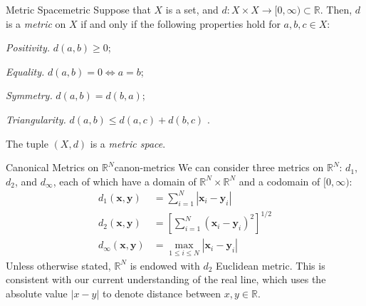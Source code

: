 \documentclass{article}
\renewcommand*\vec{\mathbf}
\numberwithin{equation}{section}
\numberwithin{figure}{section}
\newcommand*\setaxiomprefix[1]{
    \setlist[axioms]{label=#1\arabic*), ref=#1\arabic*}
}
\begin{document}
\begin{definition}{Metric Space}{metric}
    Suppose that $ X $ is a set, and $ d \colon X \times X \to [0, \infty)
    \subset \mathbb{R} $. Then, $ d $ is a \emph{metric} on $ X $ if and only if
    the following properties hold for $ a, b, c \in X $:
    \setaxiomprefix{M}
    \begin{axioms}
        \item \emph{Positivity.} $ d(a, b) \geq 0 $;
        \item \emph{Equality.} $ d(a, b) = 0 \iff a = b $;
        \item \emph{Symmetry.} $ d(a, b) = d(b, a) $;
        \item \emph{Triangularity.} $ d(a, b) \leq d(a, c) + d(b, c) $
            \label{axiom:triangle-inequality}.
    \end{axioms}
    The tuple $ (X, d) $ is a \emph{metric space}.
\end{definition}
\begin{definition}{Canonical Metrics on \texorpdfstring{$\mathbb{R}^N$}{an
        N-dimensional real vector space}}{canon-metrics}
    We can consider three metrics on $ \mathbb{R}^N $: $ d_1 $, $ d_2 $, and
    $ d_\infty $, each of which have a domain of $ \mathbb{R}^N \times
    \mathbb{R}^N $ and a codomain of $ [0, \infty) $:
    \begin{align}
        d_1(\vec{x}, \vec{y}) &= \sum_{i=1}^N \left\vert \vec{x}_i - \vec{y}_i
            \right\vert\label{eqn:d1-metric} \\
        d_2(\vec{x}, \vec{y}) &= \left[\sum_{i=1}^N (\vec{x}_i - \vec{y}_i)^2
            \right]^{1/2} \label{eqn:d2-metric} \\[.8em]
        d_\infty(\vec{x}, \vec{y}) &= \max_{1 \leq i \leq N} \left\vert
            \vec{x}_i - \vec{y}_i \right\vert\label{eqn:dinf-metric}
    \end{align}
    Unless otherwise stated, $ \mathbb{R}^N $ is endowed with $ d_2 $ Euclidean
    metric. This is consistent with our current understanding of the real line,
    which uses the absolute value $ \vert x - y \vert $ to denote distance
    between $ x, y \in \mathbb{R} $.
\end{definition}
\end{document}
